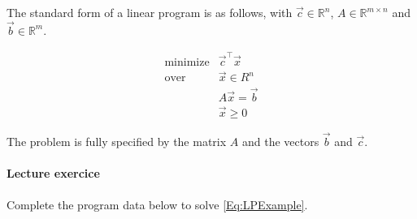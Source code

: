 \documentclass[11pt]{article}
\begin{document}
The standard form of a linear program is as follows, with
\(\vec{c} \in \mathbb{R}^n\), \(A \in \mathbb{R}^{m \times n}\) and
\(\vec{b} \in \mathbb{R}^m\).

\begin{equation}
\label{Eq:PrimalForm}
  \begin{array}{rl}
    \text{minimize} & \vec{c}^\top \vec{x} \\
    \text{over} & \vec{x} \in R^n \\
    & A \vec{x} = \vec{b} \\
    & \vec{x} \ge 0
  \end{array}
\end{equation}

The problem is fully specified by the matrix \(A\) and the vectors
\(\vec{b}\) and \(\vec{c}\).

\paragraph{Lecture exercice}\label{lecture-exercice}

Complete the program data below to solve \eqref{Eq:LPExample}.
\end{document}
